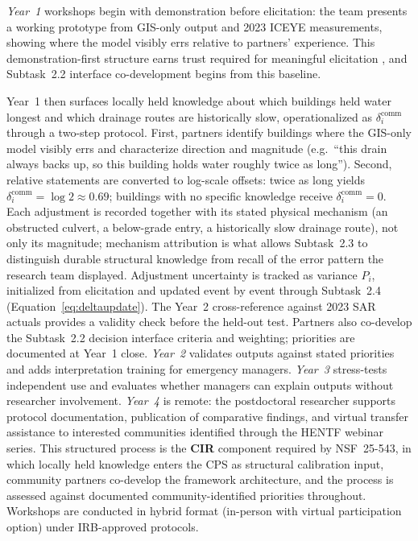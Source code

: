 \documentclass[11pt]{article}
\begin{document}
\textit{Year~1} workshops begin with demonstration before elicitation: the team presents a working prototype from GIS-only output and 2023 ICEYE measurements, showing where the model visibly errs relative to partners' experience. This demonstration-first structure earns trust required for meaningful elicitation \cite{skilton2022dontwant,habib2023anchoring}, and Subtask~2.2 interface co-development begins from this baseline.


Year~1 then surfaces locally held knowledge about which buildings held water
longest and which drainage routes are historically slow, operationalized as
$\delta_i^{\mathrm{comm}}$ through a two-step protocol.
First, partners identify buildings where the GIS-only model visibly errs and
characterize direction and magnitude (e.g.\ ``this drain always backs up, so this
building holds water roughly twice as long''). Second, relative statements are
converted to log-scale offsets: twice as long yields $\delta_i^{\mathrm{comm}} =
\log 2 \approx 0.69$; buildings with no specific knowledge receive
$\delta_i^{\mathrm{comm}} = 0$.
Each adjustment is recorded together with its stated physical mechanism (an
obstructed culvert, a below-grade entry, a historically slow drainage route),
not only its magnitude; mechanism attribution is what allows Subtask~2.3 to
distinguish durable structural knowledge from recall of the error pattern the
research team displayed.
Adjustment uncertainty is tracked as variance $P_i$, initialized from elicitation
and updated event by event through Subtask~2.4
(Equation~\eqref{eq:deltaupdate}). The Year~2 cross-reference against 2023 SAR
actuals provides a validity check before the held-out test.
Partners also co-develop the Subtask~2.2 decision interface criteria and
weighting; priorities are documented at Year~1 close.
\textit{Year~2} validates outputs against stated priorities and adds
interpretation training for emergency managers. \textit{Year~3} stress-tests
independent use and evaluates whether managers can explain outputs without
researcher involvement. \textit{Year~4} is remote: the postdoctoral researcher supports protocol documentation, publication of comparative findings, and virtual transfer assistance to interested communities identified through the HENTF webinar series.
This structured process is the \textbf{CIR} component required by NSF~25-543,
in which locally held knowledge enters the CPS as structural calibration input, community
partners co-develop the framework architecture, and the process is assessed against
documented community-identified priorities throughout.
Workshops are conducted in hybrid format (in-person with virtual participation option) under IRB-approved protocols.
\end{document}
